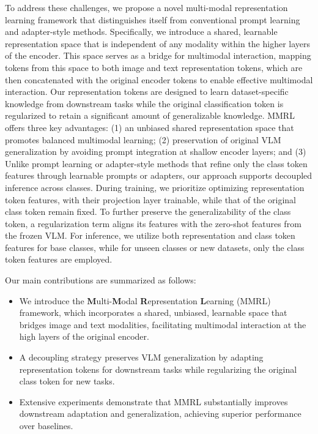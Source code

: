To address these challenges, we propose a novel multi-modal representation learning framework that distinguishes itself from conventional prompt learning and adapter-style methods. Specifically, we introduce a shared, learnable representation space that is independent of any modality within the higher layers of the encoder. This space serves as a bridge for multimodal interaction, mapping tokens from this space to both image and text representation tokens, which are then concatenated with the original encoder tokens to enable effective multimodal interaction. Our representation tokens are designed to learn dataset-specific knowledge from downstream tasks while the original classification token is regularized to retain a significant amount of generalizable knowledge. MMRL offers three key advantages: (1) an unbiased shared representation space that promotes balanced multimodal learning; (2) preservation of original VLM generalization by avoiding prompt integration at shallow encoder layers; and (3) Unlike prompt learning or adapter-style methods that refine only the class token features through learnable prompts or adapters, our approach supports decoupled inference across classes. During training, we prioritize optimizing representation token features, with their projection layer trainable, while that of the original class token remain fixed. To further preserve the generalizability of the class token, a regularization term aligns its features with the zero-shot features from the frozen VLM. For inference, we utilize both representation and class token features for base classes, while for unseen classes or new datasets, only the class token features are employed.


Our main contributions are summarized as follows:
\begin{itemize}
    \item We introduce the \textbf{M}ulti-\textbf{M}odal \textbf{R}epresentation \textbf{L}earning (MMRL) framework, which incorporates a shared, unbiased, learnable space that bridges image and text modalities, facilitating multimodal interaction at the high layers of the original encoder.
    \item A decoupling strategy preserves VLM generalization by adapting representation tokens for downstream tasks while regularizing the original class token for new tasks.
    \item Extensive experiments demonstrate that MMRL substantially improves downstream adaptation and generalization, achieving superior performance over baselines.
\end{itemize}



